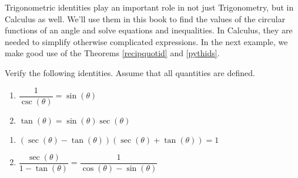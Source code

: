 \smallskip

Trigonometric identities play an important role in not just Trigonometry, but in Calculus as well.  We'll use them in this book to find the values of the circular functions of an angle and solve equations and inequalities.  In Calculus, they are needed to simplify otherwise complicated expressions.  In the next example, we make good use of the Theorems \ref{recipquotid} and \ref{pythids}.

\begin{ex} \label{idornotex1} Verify the following identities. Assume that all quantities are defined.

\begin{multicols}{2}

\begin{enumerate}

\item  $\dfrac{1}{\csc(\theta)} = \sin(\theta)$

\item  $\tan(\theta) = \sin(\theta) \sec(\theta)$ 

\setcounter{HW}{\value{enumi}}

\end{enumerate}

\end{multicols}

\begin{multicols}{2}

\begin{enumerate}

\setcounter{enumi}{\value{HW}}

\item  $(\sec(\theta) - \tan(\theta)) (\sec(\theta) + \tan(\theta)) = 1$ 

\item  $\dfrac{\sec(\theta)}{1 - \tan(\theta)} = \dfrac{1}{\cos(\theta) - \sin(\theta)}$

\setcounter{HW}{\value{enumi}}

\end{enumerate}

\end{multicols}

\begin{multicols}{2}

\begin{enumerate}

\setcounter{enumi}{\value{HW}}


\end{enumerate}
\end{multicols}
\end{ex}
